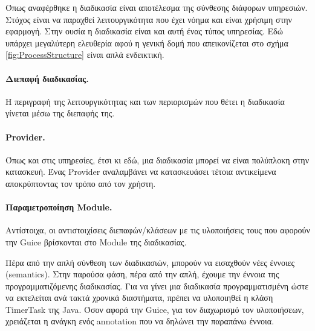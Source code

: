 Όπως αναφέρθηκε η διαδικασία είναι αποτέλεσμα της σύνθεσης 
διάφορων υπηρεσιών. Στόχος είναι να παραχθεί λειτουργικότητα που έχει 
νόημα και είναι χρήσιμη στην εφαρμογή. Στην ουσία η διαδικασία είναι και 
αυτή ένας τύπος υπηρεσίας. Εδώ υπάρχει μεγαλύτερη ελευθερία αφού 
η γενική δομή που απεικονίζεται στο σχήμα \ref{fig:ProcessStructure} 
είναι απλά ενδεικτική.

\paragraph{Διεπαφή διαδικασίας.} Η περιγραφή της λειτουργικότητας και των 
περιορισμών που θέτει η διαδικασία γίνεται μέσω της διεπαφής της.

\paragraph{Provider.} Όπως και στις υπηρεσίες, έτσι κι εδώ, μια διαδικασία 
μπορεί να είναι πολύπλοκη στην κατασκευή. Ένας Provider αναλαμβάνει να 
κατασκευάσει τέτοια αντικείμενα αποκρύπτοντας τον τρόπο από τον χρήστη.

\paragraph{Παραμετροποίηση Module.} Αντίστοιχα, οι αντιστοιχίσεις 
διεπαφών/κλάσεων με τις υλοποιήσεις τους που αφορούν την Guice 
βρίσκονται στο Module της διαδικασίας.

Πέρα από την απλή σύνθεση των διαδικασιών, μπορούν να εισαχθούν 
νέες έννοιες (semantics). Στην παρούσα φάση, πέρα από την απλή, έχουμε 
την έννοια της προγραμματιζόμενης διαδικασίας. Για να γίνει μια 
διαδικασία προγραμματισμένη ώστε να εκτελείται ανά τακτά χρονικά 
διαστήματα, πρέπει να υλοποιηθεί η κλάση TimerTask της Java. Όσον αφορά 
την Guice, για τον διαχωρισμό τον υλοποιήσεων, χρειάζεται η ανάγκη ενός 
annotation που να δηλώνει την παραπάνω έννοια.

